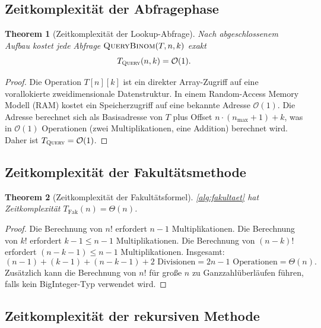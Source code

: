 ﻿\documentclass[12pt, a4paper]{article}
\newcommand{\Oh}{\mathcal{O}}
\newcommand{\query}{\textsc{Query}}
\theoremstyle{plain}
\newtheorem{theorem}{Theorem}[section]
\theoremstyle{definition}
\theoremstyle{remark}
\renewcommand{\Oh}{\mathcal{O}}
\renewcommand{\query}{\textsc{Query}}
\begin{document}
\subsection{Zeitkomplexität der Abfragephase}

\begin{theorem}[Zeitkomplexität der Lookup-Abfrage]
  \label{thm:lookup_zeit}
  Nach abgeschlossenem Aufbau kostet jede Abfrage
  $\textsc{QueryBinom}(T, n, k)$ exakt
  \begin{equation}
    T_{\query}(n, k) = \Oh(1).
    \label{eq:query_o1}
  \end{equation}
\end{theorem}

\begin{proof}
  Die Operation $T[n][k]$ ist ein direkter Array-Zugriff auf eine
  vorallokierte zweidimensionale Datenstruktur. In einem Random-Access
  Memory Modell (RAM) kostet ein Speicherzugriff auf eine bekannte Adresse
  $\Oh(1)$. Die Adresse berechnet sich als Basisadresse von $T$ plus
  Offset $n \cdot (n_{\max}+1) + k$, was in $\Oh(1)$ Operationen
  (zwei Multiplikationen, eine Addition) berechnet wird. Daher ist
  $T_{\query} = \Oh(1)$.
\end{proof}

\subsection{Zeitkomplexität der Fakultätsmethode}

\begin{theorem}[Zeitkomplexität der Fakultätsformel]
  \label{thm:fakultaet_zeit}
  \cref{alg:fakultaet} hat Zeitkomplexität $T_{\text{Fak}}(n) = \Theta(n)$.
\end{theorem}

\begin{proof}
  Die Berechnung von $n!$ erfordert $n-1$ Multiplikationen.
  Die Berechnung von $k!$ erfordert $k-1 \le n-1$ Multiplikationen.
  Die Berechnung von $(n-k)!$ erfordert $(n-k-1) \le n-1$
  Multiplikationen. Insgesamt:
  \begin{equation}
    (n-1) + (k-1) + (n-k-1) + 2 \text{ Divisionen}
    = 2n - 1 \text{ Operationen} = \Theta(n).
  \end{equation}
  Zusätzlich kann die Berechnung von $n!$ für große $n$ zu
  Ganzzahlüberläufen führen, falls kein BigInteger-Typ verwendet wird.
\end{proof}

\subsection{Zeitkomplexität der rekursiven Methode}
\end{document}
